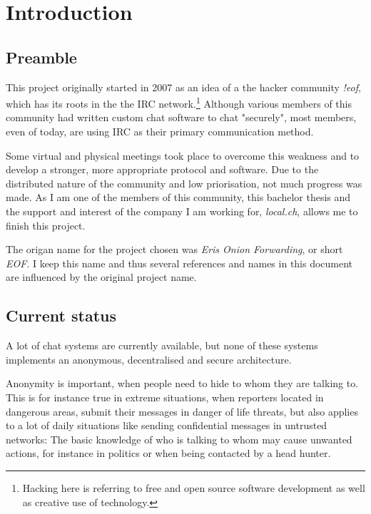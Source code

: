 \chapter{Introduction}
\section{Preamble}
This project originally started in 2007 as an idea of a the hacker
community \textit{!eof}, which has its roots in the the IRC
network.\footnote{Hacking here is referring to free and open source
software development as well as creative use of technology.}
Although various members of this community had written custom chat software
to chat "securely", most members, even of today, are using IRC as their
primary communication method.

Some virtual and physical meetings took place to overcome this weakness
and to develop a stronger, more appropriate protocol and software.
Due to the distributed nature of the community and low priorisation, not
much progress was made. As I am one of the members of this community,
this bachelor thesis and the support and interest
of the company I am working for, \textit{local.ch}, allows me to finish
this project.

The origan name for the project chosen was \textit{Eris Onion Forwarding}, or
short \textit{EOF}. I keep this name and thus several references and names
in this document are influenced by the original project name.
\section{Current status}
A lot of chat systems are currently available, 
but none of these systems implements an anonymous, decentralised and secure architecture.

Anonymity is important, when people need to hide to whom they are talking to.  
This is for instance true in extreme situations, when reporters located in 
dangerous areas, submit their messages in danger of life threats, but also 
applies to a lot of daily situations like sending confidential messages 
in untrusted networks: The basic knowledge of who is talking to whom may 
cause unwanted actions, for instance in politics or when being contacted by a head hunter.

